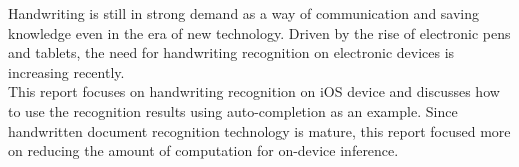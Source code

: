 Handwriting is still in strong demand as a way of communication and saving knowledge
even in the era of new technology. Driven by the rise of electronic pens and tablets,
the need for handwriting recognition on electronic devices is increasing recently.\\
This report focuses on handwriting recognition on iOS device and discusses
how to use the recognition results using auto-completion as an example.
Since handwritten document recognition technology is mature,
this report focused more on reducing the amount of computation for on-device inference.
